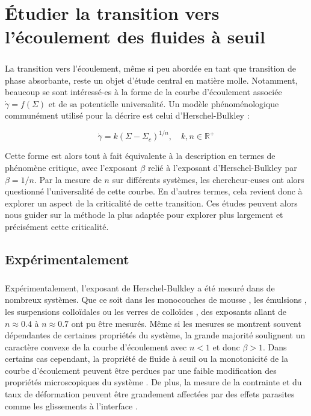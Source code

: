 \section{Étudier la transition vers l'écoulement des fluides à seuil}

\subparagraph{}La transition vers l'écoulement, même si peu abordée en tant que transition de phase absorbante, reste un objet d'étude central en matière molle. Notamment, beaucoup se sont intéressé-es à la forme de la courbe d'écoulement associée $\dot{\gamma} = f(\Sigma)$ et de sa potentielle universalité. Un modèle phénoménologique communément utilisé pour la décrire est celui d'Herschel-Bulkley \cite{herschel_konsistenzmessungen_1926} :

\begin{equation}
	\dot{\gamma} = k(\Sigma-\Sigma_c)^{1/n},\quad k,n\in \mathbb{R}^+
\end{equation}

\noindent Cette forme est alors tout à fait équivalente à la description en termes de phénomène critique, avec l'exposant $\beta$ relié à l'exposant d'Herschel-Bulkley par $\beta = 1/n$. Par la mesure de $n$ sur différents systèmes, les chercheur-euses ont alors questionné l'universalité de cette courbe. En d'autres termes, cela revient donc à explorer un aspect de la criticalité de cette transition. Ces études peuvent alors nous guider sur la méthode la plus adaptée pour explorer plus largement et précisément cette criticalité.


\subsection{Expérimentalement}

\subparagraph{}Expérimentalement, l'exposant de Herschel-Bulkley a été mesuré dans de nombreux systèmes. Que ce soit dans les monocouches de mousse \cite{katgert_flow_2009}, les émulsions \cite{becu_yielding_2006, jop_microscale_2012}, les suspensions colloïdales \cite{ovarlez_rheopexy_2013} ou les verres de colloïdes \cite{besseling_three_dimensional_2007}, des exposants allant de $n\approx 0.4$ à $n\approx 0.7$ ont pu être mesurés. Même si les mesures se montrent souvent dépendantes de certaines propriétés du système, la grande majorité soulignent un caractère convexe de la courbe d'écoulement avec $n<1$ et donc $\beta>1$. Dans certains cas cependant, la propriété de fluide à seuil ou la monotonicité de la courbe d’écoulement peuvent être perdues par une faible modification des propriétés microscopiques du système \cite{becu_yielding_2006}. De plus, la mesure de la contrainte et du taux de déformation peuvent être grandement affectées par des effets parasites comme les glissements à l'interface \cite{bonn_yield_2017}.


